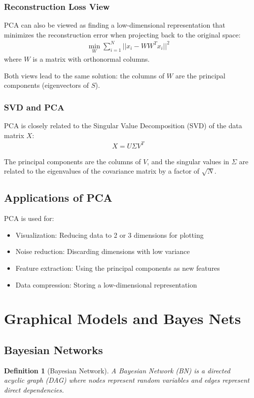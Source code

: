 \documentclass{article}
\newtheorem{definition}{Definition}
\begin{document}
\subsubsection{Reconstruction Loss View}
PCA can also be viewed as finding a low-dimensional representation that minimizes the reconstruction error when projecting back to the original space:
\begin{align}
\min_W \sum_{i=1}^{N}||x_i - WW^Tx_i||^2
\end{align}
where $W$ is a matrix with orthonormal columns.

Both views lead to the same solution: the columns of $W$ are the principal components (eigenvectors of $S$).

\subsubsection{SVD and PCA}
PCA is closely related to the Singular Value Decomposition (SVD) of the data matrix $X$:
\begin{align}
X = U\Sigma V^T
\end{align}

The principal components are the columns of $V$, and the singular values in $\Sigma$ are related to the eigenvalues of the covariance matrix by a factor of $\sqrt{N}$.

\subsection{Applications of PCA}
PCA is used for:
\begin{itemize}
\item Visualization: Reducing data to 2 or 3 dimensions for plotting
\item Noise reduction: Discarding dimensions with low variance
\item Feature extraction: Using the principal components as new features
\item Data compression: Storing a low-dimensional representation
\end{itemize}

\section{Graphical Models and Bayes Nets}

\subsection{Bayesian Networks}
\begin{definition}[Bayesian Network]
A Bayesian Network (BN) is a directed acyclic graph (DAG) where nodes represent random variables and edges represent direct dependencies.
\end{definition}
\end{document}
